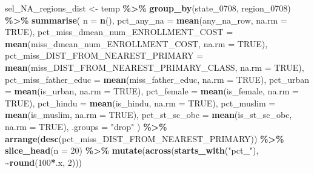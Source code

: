 \documentclass[
]{article}
\newenvironment{Shaded}{\begin{snugshade}}{\end{snugshade}}
\newcommand{\AttributeTok}[1]{\textcolor[rgb]{0.13,0.29,0.53}{#1}}
\newcommand{\ConstantTok}[1]{\textcolor[rgb]{0.56,0.35,0.01}{#1}}
\newcommand{\DecValTok}[1]{\textcolor[rgb]{0.00,0.00,0.81}{#1}}
\newcommand{\FunctionTok}[1]{\textcolor[rgb]{0.13,0.29,0.53}{\textbf{#1}}}
\newcommand{\NormalTok}[1]{#1}
\newcommand{\OtherTok}[1]{\textcolor[rgb]{0.56,0.35,0.01}{#1}}
\newcommand{\SpecialCharTok}[1]{\textcolor[rgb]{0.81,0.36,0.00}{\textbf{#1}}}
\newcommand{\StringTok}[1]{\textcolor[rgb]{0.31,0.60,0.02}{#1}}
\begin{document}
\begin{Shaded}
\begin{Highlighting}[]
\NormalTok{sel\_NA\_regions\_dist }\OtherTok{\textless{}{-}}\NormalTok{ temp }\SpecialCharTok{\%\textgreater{}\%} 
  \FunctionTok{group\_by}\NormalTok{(state\_0708, region\_0708) }\SpecialCharTok{\%\textgreater{}\%}
  \FunctionTok{summarise}\NormalTok{(}
    \AttributeTok{n =} \FunctionTok{n}\NormalTok{(),}
    \AttributeTok{pct\_any\_na =} \FunctionTok{mean}\NormalTok{(any\_na\_row, }\AttributeTok{na.rm =} \ConstantTok{TRUE}\NormalTok{),}
    \AttributeTok{pct\_miss\_dmean\_num\_ENROLLMENT\_COST =} \FunctionTok{mean}\NormalTok{(miss\_dmean\_num\_ENROLLMENT\_COST, }\AttributeTok{na.rm =} \ConstantTok{TRUE}\NormalTok{),}
    \AttributeTok{pct\_miss\_DIST\_FROM\_NEAREST\_PRIMARY =} \FunctionTok{mean}\NormalTok{(miss\_DIST\_FROM\_NEAREST\_PRIMARY\_CLASS, }\AttributeTok{na.rm =} \ConstantTok{TRUE}\NormalTok{),}
    \AttributeTok{pct\_miss\_father\_educ =} \FunctionTok{mean}\NormalTok{(miss\_father\_educ, }\AttributeTok{na.rm =} \ConstantTok{TRUE}\NormalTok{),}
    \AttributeTok{pct\_urban =} \FunctionTok{mean}\NormalTok{(is\_urban, }\AttributeTok{na.rm =} \ConstantTok{TRUE}\NormalTok{),}
    \AttributeTok{pct\_female =} \FunctionTok{mean}\NormalTok{(is\_female, }\AttributeTok{na.rm =} \ConstantTok{TRUE}\NormalTok{),}
    \AttributeTok{pct\_hindu =} \FunctionTok{mean}\NormalTok{(is\_hindu, }\AttributeTok{na.rm =} \ConstantTok{TRUE}\NormalTok{),}
    \AttributeTok{pct\_muslim =} \FunctionTok{mean}\NormalTok{(is\_muslim, }\AttributeTok{na.rm =} \ConstantTok{TRUE}\NormalTok{),}
    \AttributeTok{pct\_st\_sc\_obc =} \FunctionTok{mean}\NormalTok{(is\_st\_sc\_obc, }\AttributeTok{na.rm =} \ConstantTok{TRUE}\NormalTok{),}
    \AttributeTok{.groups =} \StringTok{"drop"}
\NormalTok{  ) }\SpecialCharTok{\%\textgreater{}\%}
  \FunctionTok{arrange}\NormalTok{(}\FunctionTok{desc}\NormalTok{(pct\_miss\_DIST\_FROM\_NEAREST\_PRIMARY)) }\SpecialCharTok{\%\textgreater{}\%}
  \FunctionTok{slice\_head}\NormalTok{(}\AttributeTok{n =} \DecValTok{20}\NormalTok{) }\SpecialCharTok{\%\textgreater{}\%}
  \FunctionTok{mutate}\NormalTok{(}\FunctionTok{across}\NormalTok{(}\FunctionTok{starts\_with}\NormalTok{(}\StringTok{"pct\_"}\NormalTok{), }\SpecialCharTok{\textasciitilde{}}\FunctionTok{round}\NormalTok{(}\DecValTok{100}\SpecialCharTok{*}\NormalTok{.x, }\DecValTok{2}\NormalTok{)))}


\end{Highlighting}
\end{Shaded}
\end{document}
